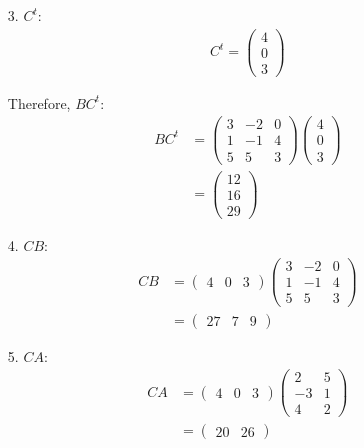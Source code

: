 \documentclass{article}
\begin{document}
\begin{enumerate}
\begin{enumerate}
\item[3.] $C^t$:
\begin{align*}
C^t = \begin{pmatrix} 4 \\ 0 \\ 3 \end{pmatrix}
\end{align*}

Therefore, $BC^t$:
\begin{align*}
BC^t &= \begin{pmatrix} 3 & -2 & 0 \\ 1 & -1 & 4 \\ 5 & 5 & 3 \end{pmatrix} \begin{pmatrix} 4 \\ 0 \\ 3 \end{pmatrix} \\
&= \begin{pmatrix} 12 \\ 16 \\ 29 \end{pmatrix}
\end{align*}

\item[4.] $CB$:
\begin{align*}
CB &= \begin{pmatrix} 4 & 0 & 3 \end{pmatrix} \begin{pmatrix} 3 & -2 & 0 \\ 1 & -1 & 4 \\ 5 & 5 & 3 \end{pmatrix} \\
&= \begin{pmatrix} 27 & 7 & 9 \end{pmatrix}
\end{align*}

\item[5.] $CA$:
\begin{align*}
CA &= \begin{pmatrix} 4 & 0 & 3 \end{pmatrix} \begin{pmatrix} 2 & 5 \\ -3 & 1 \\ 4 & 2 \end{pmatrix} \\
&= \begin{pmatrix} 20 & 26 \end{pmatrix}
\end{align*}
\end{enumerate}
\end{enumerate}
\end{document}
